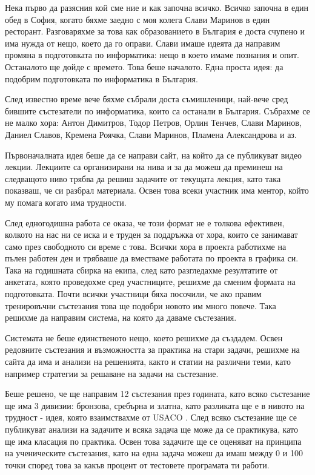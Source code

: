 \documentclass[a4paper,12pt]{article}
\begin{document}
  Нека първо да разясния кой сме ние и как започна всичко. Всичко започна в един обед в София, когато бяхме заедно с моя колега Слави Маринов в един ресторант. Разговаряхме за това как образованието в България е доста счупено и има нужда от нещо, което да го оправи. Слави имаше идеята да направим промяна в подготовката по информатика: нещо в което имаме познания и опит. Останалото ще дойде с времето. Това беше началото. Една проста идея: да подобрим подготовката по информатика в България.
  
  След известно време вече бяхме събрали доста съмишленици, най-вече сред бившите състезатели по информатика, които са останали в България. Събрахме се не малко хора: Антон Димитров, Тодор Петров, Орлин Тенчев, Слави Маринов, Даниел Славов, Кремена Роячка, Слави Маринов, Пламена Александрова и аз.
  
  Първоначалната идея беше да се направи сайт, на който да се публикуват видео лекции. Лекциите са организирани на нива и за да можеш да преминеш на следващото ниво трябва да решиш задачите от текущата лекция, като така показваш, че си разбрал материала. Освен това всеки участник има ментор, който му помага когато има трудности.
  
  След едногодишна работа се оказа, че този формат не е толкова ефективен, колкото на нас ни се иска и е труден за поддръжка от хора, които се занимават само през свободното си време с това. Всички хора в проекта работихме на пълен работен ден и трябваше да вместваме работата по проекта в графика си. Така на годишната сбирка на екипа, след като разгледахме резултатите от анкетата, която проведохме сред участниците, решихме да сменим формата на подготовката. Почти всички участници бяха посочили, че ако правим тренировъчни състезания това ще подобри новото им много повече. Така решихме да направим система, на която да даваме състезания.
  
  Системата не беше единственото нещо, което решихме да създадем. Освен редовните състезания и възможността за практика на стари задачи, решихме на сайта да има и анализи на решенията, както и статии на различни теми, като например стратегии за решаване на задачи на състезание.
  
  Беше решено, че ще направим 12 състезания през годината, като всяко състезание ще има 3 дивизии: бронзова, сребърна и златна, като разликата ще е в нивото на трудност - идея, която взаимствахме от USACO \cite{usaco_website}. След всяко състезание ще се публикуват анализи на задачите и всяка задача ще може да се практикува, като ще има класация по практика. Освен това задачите ще се оценяват на принципа на ученическите състезания, като на една задача можеш да имаш между 0 и 100 точки според това за какъв процент от тестовете програмата ти работи.
  
\end{document}
